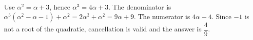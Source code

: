 Use $\alpha^2=\alpha+3$, hence $\alpha^3=4\alpha+3$. The denominator is $\alpha^3(\alpha^2-\alpha-1)+\alpha^2=2\alpha^3+\alpha^2=9\alpha+9$. The numerator is $4\alpha+4$. Since $-1$ is not a root of the quadratic, cancellation is valid and the answer is $\boxed{\dfrac{4}{9}}$.
